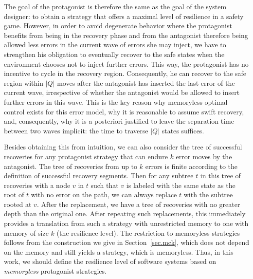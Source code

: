 \documentclass[times,10pt,twocolumn]{article}
\newcounter{sequent1}
\newcounter{sequent2}
\newcounter{sequent3}
\newcounter{sequent4}
\begin{document}
The goal of the protagonist is therefore the same as the goal of the system designer: to obtain a strategy that offers a maximal level of resilience in a safety game. 
\label{reply1.memoryless.unbounded.resilience} 
However, in order to avoid degenerate behavior where the protagonist benefits from being in the recovery phase and from the antagonist therefore being allowed less errors in the current wave of errors she may inject, we have to strengthen his obligation to eventually recover to the safe states when the environment chooses not to inject further errors.
This way, the protagonist has no incentive to cycle in the recovery region.
Consequently, he can recover to the safe region within $|Q|$ moves after the antagonist has inserted the last error of the current wave, irrespective of whether the antagonist would be allowed to insert further errors in this wave.
This is the key reason why memoryless optimal control exists for this error model, why it is reasonable to assume swift recovery, and, consequently, why it is a posteriori justified to leave the separation time between two waves implicit: the time to traverse $|Q|$ states suffices.



Besides obtaining this from intuition, we can also consider the tree of successful recoveries for any protagonist strategy that can endure $k$ error moves by the antagonist.
The tree of recoveries from up to $k$ errors is finite according to 
the definition of successful recovery segments. 
Then for any subtree $t$ in this tree of recoveries with a node $v$ in $t$ 
such that $v$ is labeled with the same state as the root of $t$ with no error on the path,   
we can always replace $t$ with the subtree rooted at $v$.  
After the replacement, we have a tree of recoveries with no greater depth than 
the original one. 
After repeating such replacements, 
this immediately provides a translation from such a strategy with unrestricted memory 
to one with memory of size $k$ (the resilience level).
The restriction to memoryless strategies follows from the construction we give 
in Section~\ref{sec.mck}, 
which does not depend on the memory and still yields a strategy, which is memoryless.
Thus, in this work, we should define the resilience level of software systems based 
on \emph{memoryless} protagonist strategies.  
\end{document}

